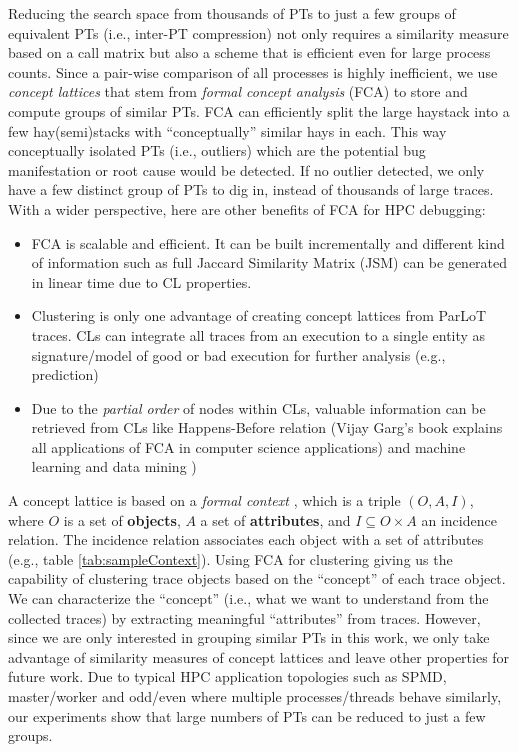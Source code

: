 Reducing the search space from thousands of PTs to just a few groups of equivalent PTs (i.e., inter-PT compression) not only requires a similarity measure based on a call matrix but also a scheme that is efficient even for large process counts.
%
Since a pair-wise comparison of all processes is highly inefficient, we use \textit{concept lattices} that stem from \textit{formal concept analysis} (FCA) \cite{clbook} to store and compute groups of similar PTs.
%
FCA can efficiently split the large haystack into a few hay(semi)stacks with ``conceptually'' similar hays in each. This way conceptually isolated PTs (i.e., outliers) which are the potential bug manifestation or root cause would be detected. If no outlier detected, we only have a few distinct group of PTs to dig in, instead of thousands of large traces. With a wider perspective, here are other benefits of FCA for HPC debugging:
\begin{itemize}
\item FCA is scalable and efficient. It can be built incrementally and different kind of information such as full Jaccard Similarity Matrix (JSM) can be generated in linear time due to CL properties.
\item Clustering is only one advantage of creating concept lattices from ParLoT traces. CLs can integrate all traces from an execution to a single entity as signature/model of good or bad execution for further analysis (e.g., prediction) 
\item Due to the \textit{partial order} of nodes within CLs, valuable information can be retrieved from CLs like Happens-Before relation (Vijay Garg’s book explains all applications of FCA in computer science applications)\cite{latticeForDistConst} and machine learning and data mining \cite{Ignatov17})
\end{itemize}

A concept lattice is based on a \textit{formal context} \cite{clbook}, which is a triple $(O, A, I)$, where $O$ is a set of \textbf{objects}, $A$ a set of \textbf{attributes}, and $I \subseteq O \times A$ an incidence relation. The incidence relation associates each object with a set of attributes (e.g., table \ref{tab:sampleContext}).
%
Using FCA for clustering giving us the capability of clustering trace objects based on the ``concept'' of each trace object. We can characterize the ``concept'' (i.e., what we want to understand from the collected traces) by extracting meaningful ``attributes'' from traces. 
%
However, since we are only interested in grouping similar PTs in this work, we only take advantage of similarity measures \cite{Alqadah2011} of concept lattices and leave other properties for future work.
%
Due to typical HPC application topologies such as SPMD, master/worker and odd/even where multiple processes/threads behave similarly, our experiments show that large numbers of PTs can be reduced to just a few groups.
%

